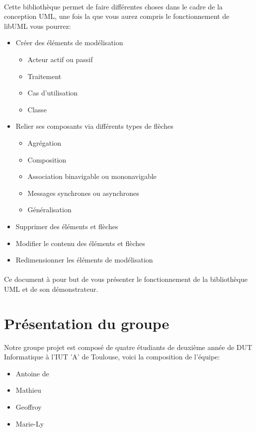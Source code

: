 	\paragraph{}	
	Cette bibliothèque permet de faire différentes choses dans le cadre de la conception UML, une fois la
	que vous aurez compris le fonctionnement de libUML vous pourrez:
	\begin{itemize}
		\item Créer des éléments de modélisation 
			\begin{itemize}
				\item Acteur actif ou passif
				\item Traitement
				\item Cas d'utilisation
				\item Classe
			\end{itemize}
		\item Relier ses composants via différents types de flèches
			\begin{itemize}
				\item Agrégation
				\item Composition
				\item Association binavigable ou mononavigable
				\item Messages synchrones ou asynchrones
				\item Généralisation
			\end{itemize}
		\item Supprimer des éléments et flèches
		\item Modifier le contenu des éléments et flèches
		\item Redimensionner les éléments de modélisation
	\end{itemize}
	\paragraph{}
Ce document à pour but de vous présenter le fonctionnement de la bibliothèque UML et de son démonstrateur. 

\section*{Présentation du groupe}
	Notre groupe projet est composé de quatre étudiants de deuxième année de DUT Informatique à l'IUT 'A' de Toulouse, voici la composition de l'équipe: 
	\begin{itemize}
		\item Antoine de  
		\item Mathieu  
		\item Geoffroy 
		\item Marie-Ly  
	\end{itemize}
	\newpage
